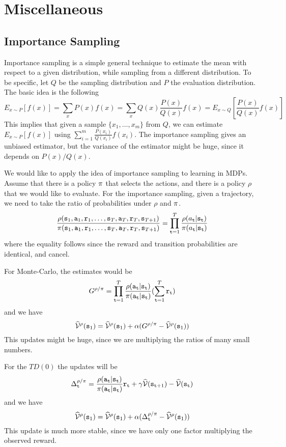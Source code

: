 \section{Miscellaneous}

\subsection{Importance Sampling}

Importance sampling is a simple general technique to estimate the
mean with respect to a given distribution, while sampling from a
different distribution. To be specific, let $Q$ be the sampling
distribution and $P$ the evaluation distribution. The basic idea is
the following
\[
E_{x\sim P}[f(x)]=\sum_x P(x)f(x)=\sum_x Q(x)\frac{P(x)}{Q(x)}
f(x)=E_{x\sim Q} [\frac{P(x)}{Q(x)}f(x)]
\]
This implies that given a sample $\{x_1, \ldots , x_m\}$ from $Q$,
we can estimate $E_{x\sim P}[f(x)]$ using $\sum_{i=1}^m
\frac{P(x_i)}{Q(x_i)}f(x_i)$.
%
The importance sampling gives an unbiased estimator, but the
variance of the estimator might be huge, since it depends on
$P(x)/Q(x)$.

We would like to apply the idea of importance sampling to learning
in MDPs. Assume that there is a policy $\pi$ that selects the
actions, and there is a policy $\rho$ that we would like to
evaluate. For the importance sampling, given a trajectory, we need
to take the ratio of probabilities under $\rho$ and $\pi$.
\[
\frac{\rho({\tt s}_1,{\tt a}_1,{\tt r}_1,
\ldots,{\tt s}_{T},{\tt a}_{T},{\tt r}_T,{\tt s}_{T+1})}{\pi({\tt s}_1,{\tt a}_1,{\tt r}_1,
\ldots,{\tt s}_{T},{\tt a}_{T},{\tt r}_T,{\tt s}_{T+1})}=\prod_{{\tt t}=1}^T
\frac{\rho(a_{\tt t}|{\tt s}_{\tt t})}{\pi(a_{\tt t}|{\tt s}_{\tt t})}
\]
where the equality follows since the reward and transition
probabilities are identical, and cancel.

For Monte-Carlo, the estimates would be
\[
G^{\rho/\pi}=\prod_{{\tt t}=1}^T
\frac{\rho({\tt a}_{\tt t}|{\tt s}_{\tt t})}{\pi({\tt a}_{\tt t}|{\tt s}_{\tt t})}
(\sum_{{\tt t}=1}^T {\tt r}_{\tt t})
\]
and we have
\[
\widehat{\mathcal{V}}^\rho ({\tt s}_1) = \widehat{\mathcal{V}}^\rho({\tt s}_1) +\alpha(
G^{\rho/\pi}- \widehat{\mathcal{V}}^\rho({\tt s}_1))
\]
This updates might be huge, since we are multiplying the ratios of
many small numbers.

For the $TD(0)$ the updates will be
\[
\Delta^{\rho/\pi}_{\tt t}
=\frac{\rho({\tt a}_{\tt t}|{\tt s}_{\tt t})}{\pi({\tt a}_{\tt t}|{\tt s}_{\tt t})}{\tt r}_{\tt t}
+\gamma \widehat{\mathcal{V}}({\tt s}_{{\tt t}+1})-\widehat{\mathcal{V}}({\tt s}_{\tt t})
\]
and we have
\[
\widehat{\mathcal{V}}^\rho ({\tt s}_1) = \widehat{\mathcal{V}}^\rho({\tt s}_1) +\alpha(
\Delta^{\rho/\pi}_{\tt t}- \widehat{\mathcal{V}}^\rho({\tt s}_1))
\]
This update is much more stable, since we have only one factor
multiplying the observed reward.


